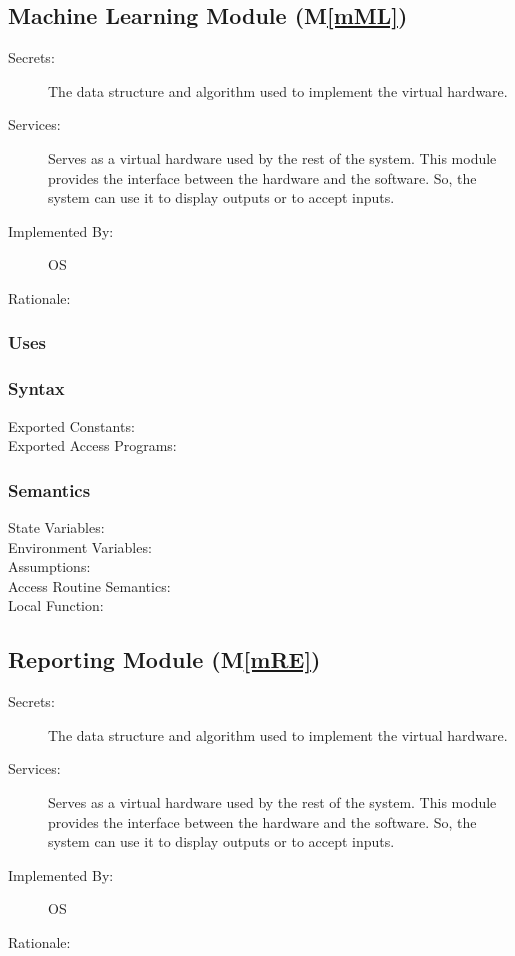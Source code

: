 \documentclass[12pt, titlepage]{article}
\newcommand{\mref}[1]{M\ref{#1}}
\begin{document}
\begin{description}
\begin{description}
\subsection{Machine Learning Module (\mref{mML})}
\begin{description}
  \item[Secrets:]The data structure and algorithm used to implement the virtual
    hardware.
  \item[Services:]Serves as a virtual hardware used by the rest of the
    system. This module provides the interface between the hardware and the
    software. So, the system can use it to display outputs or to accept inputs.
  \item[Implemented By:] OS
  \item[Rationale:] 
\end{description}

\subsubsection{Uses}

\subsubsection{Syntax}
\begin{description}
  \item[Exported Constants:] 
  \item[Exported Access Programs:] 
\end{description}

\subsubsection{Semantics}
\begin{description}
  \item[State Variables:]
  \item[Environment Variables:]  
  \item[Assumptions:] 
  \item[Access Routine Semantics:] 
  \item[Local Function:] 
\end{description}

\subsection{Reporting Module (\mref{mRE})}
\begin{description}
  \item[Secrets:]The data structure and algorithm used to implement the virtual
    hardware.
  \item[Services:]Serves as a virtual hardware used by the rest of the
    system. This module provides the interface between the hardware and the
    software. So, the system can use it to display outputs or to accept inputs.
  \item[Implemented By:] OS
  \item[Rationale:] 
\end{description}


\end{description}
\end{description}
\end{document}
